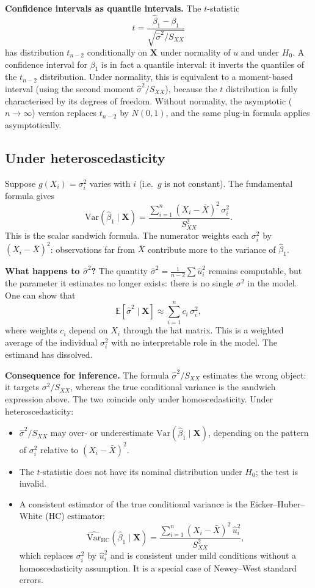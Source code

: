 \documentclass[a4paper,oneside,12pt]{extarticle}
\theoremstyle{plain}
\theoremstyle{definition}
\theoremstyle{remark}
\newcommand*{\E}{\mathbb{E}}
\newcommand*{\Var}{\mathrm{Var}}
\begin{document}
\textbf{Confidence intervals as quantile intervals.}
The $t$-statistic
\[
  t = \frac{\hat\beta_1 - \beta_1}{\sqrt{\hat\sigma^2/S_{XX}}}
\]
has distribution $t_{n-2}$ conditionally on $\mathbf{X}$ under
normality of $u$ and under $H_0$. A confidence interval for $\beta_1$
is in fact a quantile interval: it inverts the quantiles of the
$t_{n-2}$ distribution. Under normality, this is equivalent to a
moment-based interval (using the second moment $\hat\sigma^2/S_{XX}$),
because the $t$ distribution is fully characterised by its degrees of
freedom. Without normality, the asymptotic ($n\to\infty$) version
replaces $t_{n-2}$ by $N(0,1)$, and the same plug-in formula applies
asymptotically.

\subsection{Under heteroscedasticity}
\label{sec:hetero}
Suppose $g(X_i) = \sigma_i^2$ varies with $i$ (i.e.\ $g$ is not
constant). The fundamental formula gives
\[
  \Var(\hat\beta_1 \mid \mathbf{X})
  = \frac{\sum_{i=1}^n (X_i-\bar X)^2\,\sigma_i^2}{S_{XX}^2}.
\]
This is the scalar sandwich formula. The numerator weights each
$\sigma_i^2$ by $(X_i-\bar X)^2$: observations far from $\bar X$
contribute more to the variance of $\hat\beta_1$.

\textbf{What happens to $\hat\sigma^2$?}
The quantity $\hat\sigma^2 = \frac{1}{n-2}\sum\hat u_i^2$ remains
computable, but the parameter it estimates no longer exists: there is no
single $\sigma^2$ in the model. One can show that
\[
  \E[\hat\sigma^2 \mid \mathbf{X}]
  \approx \sum_{i=1}^n c_i\,\sigma_i^2,
\]
where weights $c_i$ depend on $X_i$ through the hat matrix. This is a
weighted average of the individual $\sigma_i^2$ with no interpretable
role in the model. The estimand has dissolved.

\textbf{Consequence for inference.}
The formula $\hat\sigma^2/S_{XX}$ estimates the wrong object: it targets
$\sigma^2/S_{XX}$, whereas the true conditional variance is the sandwich
expression above. The two coincide only under homoscedasticity. Under
heteroscedasticity:
\begin{itemize}
  \item $\hat\sigma^2/S_{XX}$ may over- or underestimate
        $\Var(\hat\beta_1 \mid \mathbf{X})$, depending on the pattern of
        $\sigma_i^2$ relative to $(X_i-\bar X)^2$.
  \item The $t$-statistic does not have its nominal distribution under
        $H_0$; the test is invalid.
  \item A consistent estimator of the true conditional variance is the
        Eicker--Huber--White (HC) estimator:
        \[
          \widehat{\Var}_{\mathrm{HC}}(\hat\beta_1 \mid \mathbf{X})
          = \frac{\sum_{i=1}^n (X_i-\bar X)^2\,\hat u_i^2}{S_{XX}^2},
        \]
        which replaces $\sigma_i^2$ by $\hat u_i^2$ and is consistent
        under mild conditions without a homoscedasticity assumption.
        It is a special case of Newey--West standard errors.
\end{itemize}
\end{document}
